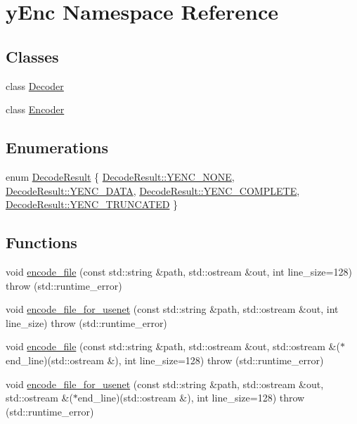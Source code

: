 \hypertarget{namespacey_enc}{}\section{y\+Enc Namespace Reference}
\label{namespacey_enc}
\subsection*{Classes}
\begin{DoxyCompactItemize}
\item 
class \hyperlink{classy_enc_1_1_decoder}{Decoder}
\item 
class \hyperlink{classy_enc_1_1_encoder}{Encoder}
\end{DoxyCompactItemize}
\subsection*{Enumerations}
\begin{DoxyCompactItemize}
\item 
enum \hyperlink{namespacey_enc_a6e002c8cbde1ad4f0f425b0b2b62c7ff}{Decode\+Result} \{ \hyperlink{namespacey_enc_a6e002c8cbde1ad4f0f425b0b2b62c7ffaf1945d067db1e827dbc9bf2237443bbe}{Decode\+Result\+::\+Y\+E\+N\+C\+\_\+\+N\+O\+NE}, 
\hyperlink{namespacey_enc_a6e002c8cbde1ad4f0f425b0b2b62c7ffa9831c661885aff04d218fdb18f491db4}{Decode\+Result\+::\+Y\+E\+N\+C\+\_\+\+D\+A\+TA}, 
\hyperlink{namespacey_enc_a6e002c8cbde1ad4f0f425b0b2b62c7ffa71836824fc63da073c7382135d3761c6}{Decode\+Result\+::\+Y\+E\+N\+C\+\_\+\+C\+O\+M\+P\+L\+E\+TE}, 
\hyperlink{namespacey_enc_a6e002c8cbde1ad4f0f425b0b2b62c7ffaf71c566c30087437fd8af0c677d71845}{Decode\+Result\+::\+Y\+E\+N\+C\+\_\+\+T\+R\+U\+N\+C\+A\+T\+ED}
 \}
\end{DoxyCompactItemize}
\subsection*{Functions}
\begin{DoxyCompactItemize}
\item 
void \hyperlink{namespacey_enc_aeb955c32dcf385759351e2792472819e}{encode\+\_\+file} (const std\+::string \&path, std\+::ostream \&out, int line\+\_\+size=128)  throw (std\+::runtime\+\_\+error)
\item 
void \hyperlink{namespacey_enc_a829a7c38464eb09e2c1d210668c6207a}{encode\+\_\+file\+\_\+for\+\_\+usenet} (const std\+::string \&path, std\+::ostream \&out, int line\+\_\+size)  throw (std\+::runtime\+\_\+error)
\item 
void \hyperlink{namespacey_enc_a2f5357e2cf810e07ffdbdd631b4d65b6}{encode\+\_\+file} (const std\+::string \&path, std\+::ostream \&out, std\+::ostream \&($\ast$end\+\_\+line)(std\+::ostream \&), int line\+\_\+size=128)  throw (std\+::runtime\+\_\+error)
\item 
void \hyperlink{namespacey_enc_a7284d85b7024d64df6d7d7634b141017}{encode\+\_\+file\+\_\+for\+\_\+usenet} (const std\+::string \&path, std\+::ostream \&out, std\+::ostream \&($\ast$end\+\_\+line)(std\+::ostream \&), int line\+\_\+size=128)  throw (std\+::runtime\+\_\+error)
\end{DoxyCompactItemize}


